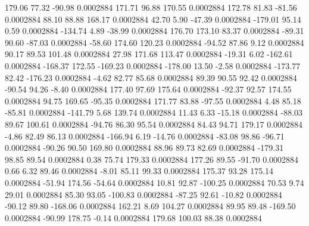       179.06       77.32      -90.98     0.0002884
      171.71       96.88      170.55     0.0002884
      172.78       81.83      -81.56     0.0002884
       88.10       88.88      168.17     0.0002884
       42.70        5.90      -47.39     0.0002884
     -179.01       95.14        0.59     0.0002884
     -134.74        4.89      -38.99     0.0002884
      176.70      173.10       83.37     0.0002884
      -89.31       90.60      -87.03     0.0002884
      -58.60      174.60      120.23     0.0002884
      -94.52       87.86        9.12     0.0002884
       90.17       89.53      101.48     0.0002884
       27.98      171.68      113.47     0.0002884
      -19.31        6.02     -162.61     0.0002884
     -168.37      172.55     -169.23     0.0002884
     -178.00       13.50       -2.58     0.0002884
     -173.77       82.42     -176.23     0.0002884
       -4.62       82.77       85.68     0.0002884
       89.39       90.55       92.42     0.0002884
      -90.54       94.26       -8.40     0.0002884
      177.40       97.69      175.64     0.0002884
      -92.37       92.57      174.55     0.0002884
       94.75      169.65      -95.35     0.0002884
      171.77       83.88      -97.55     0.0002884
        4.48       85.18      -85.81     0.0002884
     -141.79        5.68      139.74     0.0002884
       11.43        6.33      -15.18     0.0002884
      -88.03       89.67      100.61     0.0002884
      -94.76       86.30       95.54     0.0002884
       84.43       94.71      179.17     0.0002884
       -4.86       82.49       86.13     0.0002884
     -166.94        6.19      -14.76     0.0002884
      -83.08       98.86      -96.71     0.0002884
      -90.26       90.50      169.80     0.0002884
       88.96       89.73       82.69     0.0002884
     -179.31       98.85       89.54     0.0002884
        0.38       75.74      179.33     0.0002884
      177.26       89.55      -91.70     0.0002884
        0.66        6.32       89.46     0.0002884
       -8.01       85.11       99.33     0.0002884
      175.37       93.28      175.14     0.0002884
      -51.94      174.56      -54.64     0.0002884
       10.81       92.87     -100.25     0.0002884
       70.53        9.74       29.01     0.0002884
       85.30       93.05     -100.83     0.0002884
      -87.25       92.61      -10.82     0.0002884
      -90.12       89.80     -168.06     0.0002884
      162.21        8.69      104.27     0.0002884
       89.95       89.48     -169.50     0.0002884
      -90.99      178.75       -0.14     0.0002884
      179.68      100.03       88.38     0.0002884
